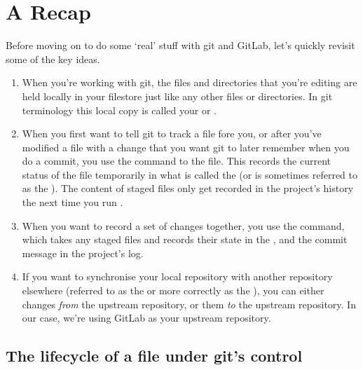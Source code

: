 \section{A Recap}

Before moving on to do some `real' stuff with git and GitLab, let's quickly revisit some of the key ideas.

\begin{enumerate} 
\item When you're working with git, the files and directories that you're editing are held locally in your filestore just like any other files or directories. In git terminology this local copy is called your  or . 
\item When you first want to tell git to track a file fore you, or after you've modified a file with a change that you want git to later remember when you do a commit, you use the  command to  the file. This records the current status of the file temporarily in what is called the  (or is sometimes referred to as the ). The content of staged files only get recorded in the project's history the next time you run . 
\item When you want to record a set of changes together, you use the  command, which takes any staged files and records their state in the , and the commit message in the project's log.
\item If you want to synchronise your local repository with another repository elsewhere (referred to as the  or more correctly as the ), you can either  changes \emph{from} the upstream repository, or  them \emph{to} the upstream repository. In our case, we're using GitLab as your upstream repository.
\end{enumerate}


\subsection{The lifecycle of a file under git's control}

